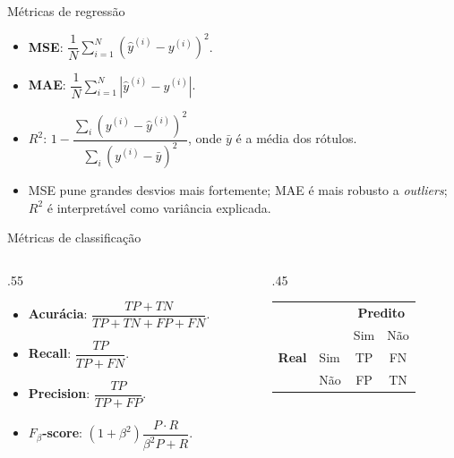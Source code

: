 \documentclass[aspectratio=169,xcolor=dvipsnames]{beamer}
\begin{document}
  \begin{frame}{Métricas de regressão}
    \begin{itemize}
      \item \textbf{MSE}: $\dfrac{1}{N}\sum_{i=1}^{N}(\hat y^{(i)}-y^{(i)})^{2}$.
      \item \textbf{MAE}: $\dfrac{1}{N}\sum_{i=1}^{N}|\hat y^{(i)}-y^{(i)}|$.
      \item \textbf{$R^{2}$}: $1-\dfrac{\sum_i (y^{(i)}-\hat y^{(i)})^{2}}{\sum_i (y^{(i)}-\bar y)^{2}}$,
        onde $\bar y$ é a média dos rótulos.
      \item MSE pune grandes desvios mais fortemente; MAE é mais robusto a \textit{outliers};
        $R^{2}$ é interpretável como variância explicada.
    \end{itemize}
  \end{frame}

  \begin{frame}{Métricas de classificação}
    \begin{columns}
      \begin{column}{.55\linewidth}
        \begin{itemize}
          \item \textbf{Acurácia}: $\dfrac{TP+TN}{TP+TN+FP+FN}$.
          \item \textbf{Recall}: $\dfrac{TP}{TP+FN}$.
          \item \textbf{Precision}: $\dfrac{TP}{TP+FP}$.
          \item \textbf{$F_\beta$-score}: $(1+\beta^{2})\dfrac{P\cdot R}{\beta^{2}P+R}$.
        \end{itemize}
      \end{column}
      \begin{column}{.45\linewidth}
        \centering
        \begin{tabular}{ll|cc}
          \toprule
            & & \multicolumn{2}{c}{\textbf{Predito}} \\
            & & Sim & Não \\
          \midrule
          \textbf{Real} & Sim & TP & FN \\
                        & Não & FP & TN \\
          \bottomrule
        \end{tabular}
      \end{column}
    \end{columns}
  \end{frame}
\end{document}
